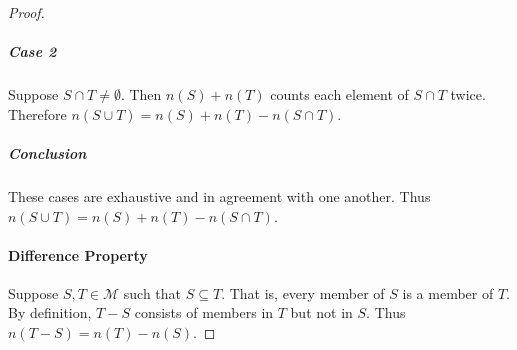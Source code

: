 \documentclass{article}
\begin{document}
\begin{proof}
    \subparagraph{Case 2}%

      Suppose $S \cap T \neq \emptyset$.
      Then $n(S) + n(T)$ counts each element of $S \cap T$ twice.
      Therefore $n(S \cup T) = n(S) + n(T) - n(S \cap T)$.

    \subparagraph{Conclusion}%

      These cases are exhaustive and in agreement with one another.
      Thus $n(S \cup T) = n(S) + n(T) - n(S \cap T)$.

  \paragraph{Difference Property}%

    Suppose $S, T \in \mathscr{M}$ such that $S \subseteq T$.
    That is, every member of $S$ is a member of $T$.
    By definition, $T - S$ consists of members in $T$ but not in $S$.
    Thus $n(T - S) = n(T) - n(S)$.

\end{proof}
\end{document}
